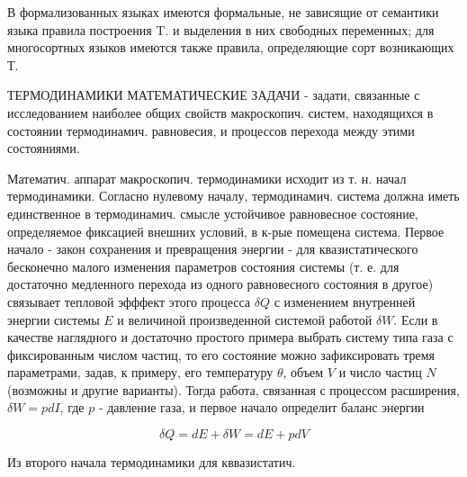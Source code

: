 \documentclass[10pt]{article}
\begin{document}
В формализованных языках имеются формальные, не зависящие от семантики языка правила построения $\mathrm{T}$. и выделения в них свободных переменных; для многосортных языков имеются также правила, определяющие сорт возникающих Т.



ТЕРМОДИНАМИКИ МАТЕМАТИЧЕСКИЕ ЗАДАЧИ - задати, связанные с исследованием наиболее общих свойств макроскопич. систем, находящихся в состоянии термодинамич. равновесия, и процессов перехода между этими состояниями.



Математич. аппарат макроскопич. термодинамики исходит из т. н. начал термодинамики. Согласно нулевому началу, термодинамич. система должна иметь единственное в термодинамич. смысле устойчивое равновесное состояние, определяемое фиксацией внешних условий, в к-рые помещена система. Первое начало - закон сохранения и превращения энергии - для квазистатического бесконечно малого изменения параметров состояния системы (т. е. для достаточно медленного перехода из одного равновесного состояния в другое) связывает тепловой эфффект этого процесса $\delta Q$ с изменением внутренней энергии системы $E$ и величиной произведенной системой работой $\delta W$. Если в качестве наглядного и достаточно простого примера выбрать систему типа газа с фиксированным числом частиц, то его состояние можно зафиксировать тремя параметрами, задав, к примеру, его температуру $\theta$, объем $V$ и число частиц $N$ (возможны и другие варианты). Тогда работа, связанная с процессом расширения, $\delta W=p d I$, где $p$ - давление газа, и первое начало определит баланс энергии



\[

\delta Q=d E+\delta W=d E+p d V

\]



Из второго начала термодинамики для кввазистатич.
\end{document}
